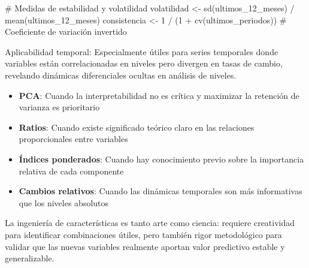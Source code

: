 \documentclass[
  letterpaper,
  DIV=11,
  numbers=noendperiod]{scrreprt}
\newenvironment{Shaded}{\begin{snugshade}}{\end{snugshade}}
\newcommand{\CommentTok}[1]{\textcolor[rgb]{0.37,0.37,0.37}{#1}}
\newcommand{\DecValTok}[1]{\textcolor[rgb]{0.68,0.00,0.00}{#1}}
\newcommand{\FunctionTok}[1]{\textcolor[rgb]{0.28,0.35,0.67}{#1}}
\newcommand{\NormalTok}[1]{\textcolor[rgb]{0.00,0.23,0.31}{#1}}
\newcommand{\OtherTok}[1]{\textcolor[rgb]{0.00,0.23,0.31}{#1}}
\newcommand{\SpecialCharTok}[1]{\textcolor[rgb]{0.37,0.37,0.37}{#1}}
\providecommand{\tightlist}{%
  \setlength{\itemsep}{0pt}\setlength{\parskip}{0pt}}
\begin{document}
\begin{enumerate}
\begin{Shaded}
\begin{Highlighting}[]
\CommentTok{\# Medidas de estabilidad y volatilidad}
\NormalTok{volatilidad }\OtherTok{\textless{}{-}} \FunctionTok{sd}\NormalTok{(ultimos\_12\_meses) }\SpecialCharTok{/} \FunctionTok{mean}\NormalTok{(ultimos\_12\_meses)}
\NormalTok{consistencia }\OtherTok{\textless{}{-}} \DecValTok{1} \SpecialCharTok{/}\NormalTok{ (}\DecValTok{1} \SpecialCharTok{+} \FunctionTok{cv}\NormalTok{(ultimos\_periodos))  }\CommentTok{\# Coeficiente de variación invertido}
\end{Highlighting}
\end{Shaded}

  Aplicabilidad temporal: Especialmente útiles para series temporales
  donde variables están correlacionadas en niveles pero divergen en
  tasas de cambio, revelando dinámicas diferenciales ocultas en análisis
  de niveles.
\end{enumerate}

\begin{tcolorbox}[enhanced jigsaw, breakable, toprule=.15mm, bottomtitle=1mm, coltitle=black, colbacktitle=quarto-callout-note-color!10!white, titlerule=0mm, opacitybacktitle=0.6, bottomrule=.15mm, toptitle=1mm, title=\textcolor{quarto-callout-note-color}{\faInfo}\hspace{0.5em}{Criterios de selección de estrategia}, arc=.35mm, rightrule=.15mm, opacityback=0, colframe=quarto-callout-note-color-frame, leftrule=.75mm, left=2mm, colback=white]

\begin{itemize}
\tightlist
\item
  \textbf{PCA}: Cuando la interpretabilidad no es crítica y maximizar la
  retención de varianza es prioritario
\item
  \textbf{Ratios}: Cuando existe significado teórico claro en las
  relaciones proporcionales entre variables
\item
  \textbf{Índices ponderados}: Cuando hay conocimiento previo sobre la
  importancia relativa de cada componente
\item
  \textbf{Cambios relativos}: Cuando las dinámicas temporales son más
  informativas que los niveles absolutos
\end{itemize}

\end{tcolorbox}

La ingeniería de características es tanto arte como ciencia: requiere
creatividad para identificar combinaciones útiles, pero también rigor
metodológico para validar que las nuevas variables realmente aportan
valor predictivo estable y generalizable.
\end{document}
